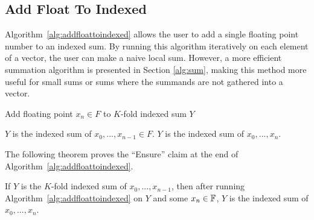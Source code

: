 \subsection{Add Float To Indexed}
  \label{sec:addfloattoindexed}
  Algorithm~\ref{alg:addfloattoindexed} allows the user to add a single floating
  point number to an indexed sum. By running this algorithm iteratively on each
  element of a vector, the user can make a naive local sum. However, a more
  efficient summation algorithm is presented in Section \ref{alg:sum}, making this method more useful for small sums or sums where the summands are not gathered into a vector.

  \begin{alg}
    Add floating point $x_n \in F$ to $K$-fold indexed sum $Y$
    \label{alg:addfloattoindexed}
    \begin{algorithmic}[1]
      \Require
        $Y$ is the indexed sum of $x_0, ..., x_{n - 1} \in F$.
        \State {}
        \State {}
        \State {}
      \EndFunction
      \Ensure
        $Y$ is the indexed sum of $x_0, ..., x_{n}$.
    \end{algorithmic}
  \end{alg}

  The following theorem proves the ``Ensure'' claim at the end of Algorithm~\ref{alg:addfloattoindexed}.
  \begin{thm}
    If $Y$ is the $K$-fold indexed sum of $x_0, ..., x_{n - 1}$, then after
    running Algorithm~\ref{alg:addfloattoindexed} on $Y$ and some $x_n \in \mathbb{F}$,
    $Y$ is the indexed sum of $x_0, ..., x_n$.
    \label{thm:addfloattoindexed}
  \end{thm}

